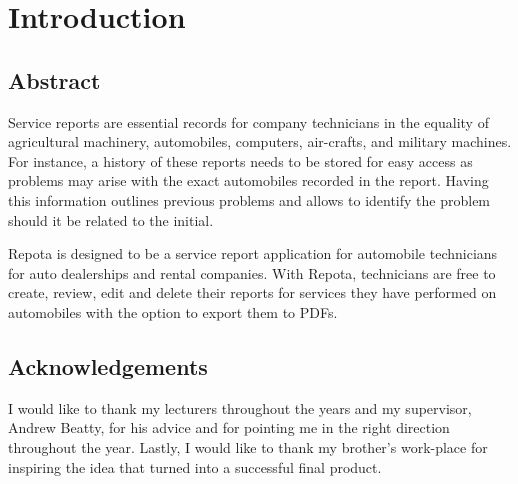 \chapter{Introduction}

\section{Abstract}
Service reports are essential records for company technicians in the equality of agricultural machinery, automobiles, computers, air-crafts, and military machines. For instance, a history of these reports needs to be stored for easy access as problems may arise with the exact automobiles recorded in the report. Having this information outlines previous problems and allows to identify the problem should it be related to the initial. 

Repota is designed to be a service report application for automobile technicians for auto dealerships and rental companies. With Repota, technicians are free to create, review, edit and delete their reports for services they have performed on automobiles with the option to export them to PDFs.

\section{Acknowledgements}
 I would like to thank my lecturers throughout the years and my supervisor, Andrew Beatty, for his advice and for pointing me in the right direction throughout the year. Lastly, I would like to thank my brother's work-place for inspiring the idea that turned into a successful final product.

